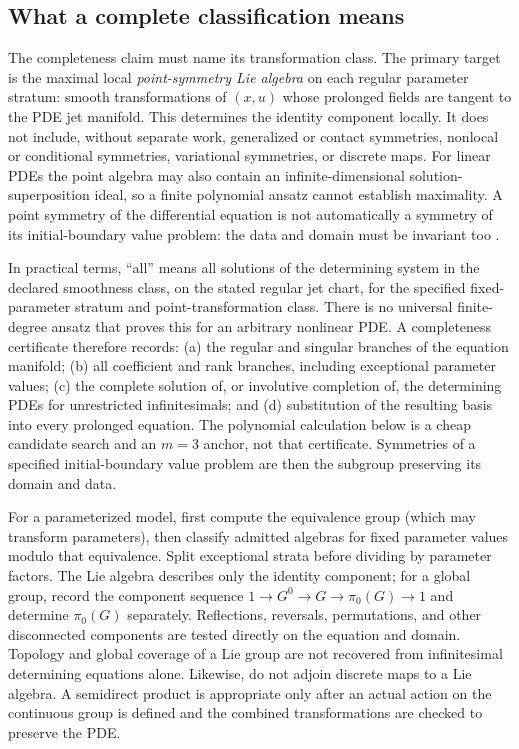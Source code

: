 \documentclass[11pt]{article}
\begin{document}
\subsection{What a complete classification means}
The completeness claim must name its transformation class. The primary target
is the maximal local \emph{point-symmetry Lie algebra} on each regular parameter
stratum: smooth transformations of $(x,u)$ whose prolonged fields are tangent
to the PDE jet manifold. This determines the identity component locally. It
does not include, without separate work, generalized or contact symmetries,
nonlocal or conditional symmetries, variational symmetries, or discrete maps.
For linear PDEs the point algebra may also contain an infinite-dimensional
solution-superposition ideal, so a finite polynomial ansatz cannot establish
maximality. A point symmetry of the differential equation is not automatically
a symmetry of its initial-boundary value problem: the data and domain must be
invariant too \cite{beligiannis}.

In practical terms, ``all'' means all solutions of the determining system in
the declared smoothness class, on the stated regular jet chart, for the
specified fixed-parameter stratum and point-transformation class. There is no
universal finite-degree ansatz that proves this for an arbitrary nonlinear
PDE. A completeness certificate therefore records: (a) the regular and
singular branches of the equation manifold; (b) all coefficient and rank
branches, including exceptional parameter values; (c) the complete solution
of, or involutive completion of, the determining PDEs for unrestricted
infinitesimals; and (d) substitution of the resulting basis into every
prolonged equation. The polynomial calculation below is a cheap candidate
search and an $m=3$ anchor, not that certificate. Symmetries of a specified
initial-boundary value problem are then the subgroup preserving its domain
and data.

For a parameterized model, first compute the equivalence group (which may
transform parameters), then classify admitted algebras for fixed parameter
values modulo that equivalence. Split exceptional strata before dividing by
parameter factors. The Lie algebra describes only the identity component;
for a global group, record the component sequence
$1\to G^0\to G\to\pi_0(G)\to1$ and determine $\pi_0(G)$ separately.
Reflections, reversals, permutations, and other disconnected components are
tested directly on the equation and domain. Topology and global coverage of a
Lie group are not recovered from infinitesimal determining equations alone.
Likewise, do not adjoin discrete maps to a Lie algebra. A semidirect product
is appropriate only after an actual action on the continuous group is defined
and the combined transformations are checked to preserve the PDE.
\end{document}
